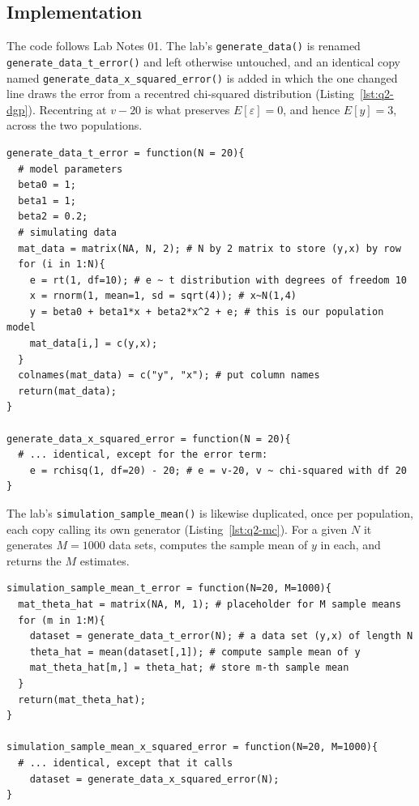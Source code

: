 \documentclass[11pt]{article}
\newcommand{\code}[1]{\texttt{#1}}
\begin{document}
\subsection{Implementation}

The code follows Lab Notes 01. The lab's \code{generate\_data()} is renamed
\code{generate\_data\_t\_error()} and left otherwise untouched, and an identical
copy named \code{generate\_data\_x\_squared\_error()} is added in which the one
changed line draws the error from a recentred chi-squared distribution
(Listing~\ref{lst:q2-dgp}). Recentring at $v - 20$ is what preserves
$E[\varepsilon] = 0$, and hence $E[y] = 3$, across the two populations.

\begin{lstlisting}[style=Rcode,caption={The two data generating processes. Only
the line drawing \code{e} differs (excerpt from
\code{R/q2\_monte\_carlo.R}).},label={lst:q2-dgp}]
generate_data_t_error = function(N = 20){
  # model parameters
  beta0 = 1;
  beta1 = 1;
  beta2 = 0.2;
  # simulating data
  mat_data = matrix(NA, N, 2); # N by 2 matrix to store (y,x) by row
  for (i in 1:N){
    e = rt(1, df=10); # e ~ t distribution with degrees of freedom 10
    x = rnorm(1, mean=1, sd = sqrt(4)); # x~N(1,4)
    y = beta0 + beta1*x + beta2*x^2 + e; # this is our population model
    mat_data[i,] = c(y,x);
  }
  colnames(mat_data) = c("y", "x"); # put column names
  return(mat_data);
}

generate_data_x_squared_error = function(N = 20){
  # ... identical, except for the error term:
    e = rchisq(1, df=20) - 20; # e = v-20, v ~ chi-squared with df 20
}
\end{lstlisting}

The lab's \code{simulation\_sample\_mean()} is likewise duplicated, once per
population, each copy calling its own generator
(Listing~\ref{lst:q2-mc}). For a given $N$ it generates $M = 1000$ data sets,
computes the sample mean of $y$ in each, and returns the $M$ estimates.

\begin{lstlisting}[style=Rcode,caption={The Monte Carlo loop, duplicated once
per population (excerpt from \code{R/q2\_monte\_carlo.R}).},label={lst:q2-mc}]
simulation_sample_mean_t_error = function(N=20, M=1000){
  mat_theta_hat = matrix(NA, M, 1); # placeholder for M sample means
  for (m in 1:M){
    dataset = generate_data_t_error(N); # a data set (y,x) of length N
    theta_hat = mean(dataset[,1]); # compute sample mean of y
    mat_theta_hat[m,] = theta_hat; # store m-th sample mean
  }
  return(mat_theta_hat);
}

simulation_sample_mean_x_squared_error = function(N=20, M=1000){
  # ... identical, except that it calls
    dataset = generate_data_x_squared_error(N);
}
\end{lstlisting}
\end{document}
